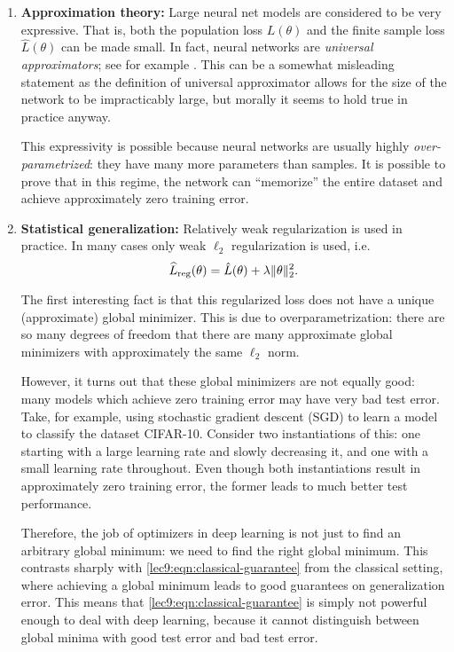 \begin{enumerate} 
\item {\bf Approximation theory:} Large neural net models are considered to be very expressive. That is, both the population loss $L(\theta)$ and the finite sample loss $\hat{L}(\theta)$ can be made small. In fact, neural networks are \textit{universal approximators}; see for example \cite{hornik1991}. This can be a somewhat misleading statement as the definition of universal approximator allows for the size of the network to be impracticably large, but morally it seems to hold true in practice anyway.
        
This expressivity is possible because neural networks are usually highly \textit{over-parametrized}: they have many more parameters than samples. It is possible to prove that in this regime, the network can ``memorize'' the entire dataset and achieve approximately zero training error.
    
\item {\bf Statistical generalization:} Relatively weak regularization is used in practice. In many cases only weak $\ell_2$ regularization is used, i.e.
\begin{equation}
\widehat{L}_{\textup{reg}}(\theta)=\hat{L}(\theta)+\lambda\|\theta\|_2^2.
\end{equation}
    
The first interesting fact is that this regularized loss does not have a unique (approximate) global minimizer. This is due to overparametrization: there are so many degrees of freedom that there are many approximate global minimizers with approximately the same $\ell_2$ norm.
    
However, it turns out that these global minimizers are not equally good: many models which achieve zero training error may have very bad test error. Take, for example, using stochastic gradient descent (SGD) to learn a model to classify the dataset CIFAR-10. Consider two instantiations of this: one starting with a large learning rate and slowly decreasing it, and one with a small learning rate throughout. Even though both instantiations result in approximately zero training error, the former leads to much better test performance. 

Therefore, the job of optimizers in deep learning is not just to find an arbitrary global minimum: we need to find the right global minimum. This contrasts sharply with \eqref{lec9:eqn:classical-guarantee} from the classical setting, where achieving a global minimum leads to good guarantees on generalization error. This means that \eqref{lec9:eqn:classical-guarantee} is simply not powerful enough to deal with deep learning, because it cannot distinguish between global minima with good test error and bad test error.


\end{enumerate}
